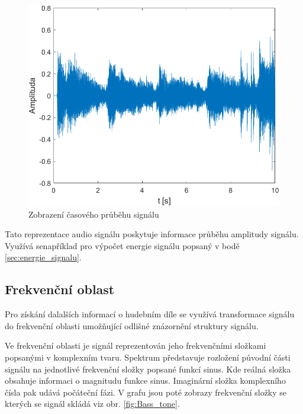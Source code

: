   \begin{figure}[H]
    \centering
    \includegraphics[width = 0.8\linewidth]{obrazky/Waveform.png}
    \caption{Zobrazení časového průběhu signálu}
    \label{fig:Waveform}
  \end{figure}

  Tato reprezentace audio signálu poskytuje informace průběhu amplitudy signálu. Využívá senapříklad pro výpočet energie signálu popsaný v bodě \ref{sec:energie_signalu}.
  
  \subsection{Frekvenční oblast} \label{sec:FT}
  Pro získání dalalších informací o hudebním díle se využívá transformace signálu do frekvenční oblasti umožňující odlišné znázornění struktury signálu.

  Ve frekvenční oblasti je signál reprezentován jeho frekvenčními složkami popsanými v komplexním tvaru.
  Spektrum představuje rozložení původní části signálu na jednotlivé frekvenční složky popsané funkcí sinus. Kde reálná složka obsahuje informaci o magnitudu  funkce sinus.
  Imaginární složka komplexního čísla pak udává počáteční fázi.
  V grafu jsou poté zobrazy frekvenční složky se kterých se signál skládá viz obr. \ref*{fig:Bass_tone}.

